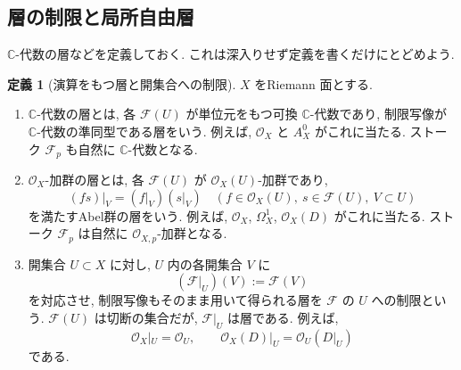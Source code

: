 \documentclass[dvipdfmx,a4paper,11pt]{article} %
\newcommand{\C}{\mathbb{C}}
\theoremstyle{definition}
\numberwithin{equation}{section}
\newtheorem{dfn}[thm]{定義}
\begin{document}
\subsection{層の制限と局所自由層}\label{sec-restriction-locally-free}

$\C$-代数の層などを定義しておく. これは深入りせず定義を書くだけにとどめよう.
\begin{dfn}[演算をもつ層と開集合への制限]\label{O-M203}\label{O-M204}
$X$ をRiemann 面とする.
\begin{enumerate}
\item

$\C$-代数の層とは, 各 $\mathcal F(U)$ が単位元をもつ可換 $\C$-代数であり, 
制限写像が $\C$-代数の準同型である層をいう.
例えば, $\mathcal O_X$ と $A_X^0$ がこれに当たる.
ストーク $\mathcal F_p$ も自然に $\C$-代数となる.

\item

$\mathcal O_X$-加群の層とは, 各 $\mathcal F(U)$ が $\mathcal O_X(U)$-加群であり, 
\[
(fs)|_V=(f|_V)(s|_V)
\quad
(f\in\mathcal O_X(U),\ s\in\mathcal F(U),\ V\subset U)
\]
を満たすAbel群の層をいう.
例えば, $\mathcal O_X$, $\Omega_X^1$, $\mathcal O_X(D)$ がこれに当たる.
ストーク $\mathcal F_p$ は自然に $\mathcal O_{X,p}$-加群となる.

\item

開集合 $U\subset X$ に対し, $U$ 内の各開集合 $V$ に
\[
(\mathcal F|_U)(V):=\mathcal F(V)
\]
を対応させ, 制限写像もそのまま用いて得られる層を
$\mathcal F$ の $U$ への制限という.
$\mathcal F(U)$ は切断の集合だが, $\mathcal F|_U$ は層である.
例えば, 
\[
\mathcal O_X|_U=\mathcal O_U,\qquad
\mathcal O_X(D)|_U=\mathcal O_U(D|_U)
\]
である.
\end{enumerate}
\end{dfn}
\end{document}
